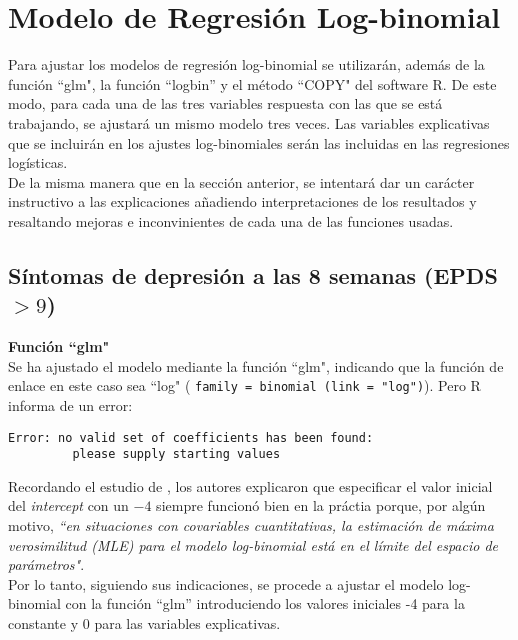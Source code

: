\section{Modelo de Regresión Log-binomial}\label{cap:aplicacionlogbinomial} 

Para ajustar los modelos de regresión log-binomial se utilizarán, además de la función ``glm", la función ``logbin'' y el método ``COPY" del software R. De este modo, para cada una de las tres variables respuesta con las que se está trabajando, se ajustará un mismo modelo tres veces. Las variables explicativas que se incluirán en los ajustes log-binomiales serán las incluidas en las regresiones logísticas. \\

De la misma manera que en la sección anterior, se intentará dar un carácter instructivo a las explicaciones añadiendo interpretaciones de los resultados y resaltando mejoras e inconvinientes de cada una de las funciones usadas. 


\subsection{Síntomas de depresión a las 8 semanas (EPDS$>9$)}\label{sec:logbinomial8}
 \textbf{Función ``glm"}\\
[0.3cm]
Se ha ajustado el modelo mediante la función ``glm", indicando que la función de enlace en este caso sea ``log" ( \lstinline{family = binomial (link = "log")}). Pero R informa de un error:

\begin{Verbatim}[formatcom=\color{Red},  xleftmargin=2.2cm]
Error: no valid set of coefficients has been found: 
         please supply starting values
\end{Verbatim}

Recordando el estudio de \textcite{COPY}, los autores explicaron que especificar el valor inicial del \textit{intercept} con un $-4$ siempre funcionó bien en la práctia porque, por algún motivo, \textit{``en  situaciones con covariables cuantitativas, la estimación de máxima verosimilitud (MLE) para el modelo log-binomial está en el límite del espacio de parámetros"}. \\

Por lo tanto, siguiendo sus indicaciones, se procede a ajustar el modelo log-binomial con la función ``glm'' introduciendo los valores iniciales -4 para la constante y 0 para las variables explicativas.\\ 

